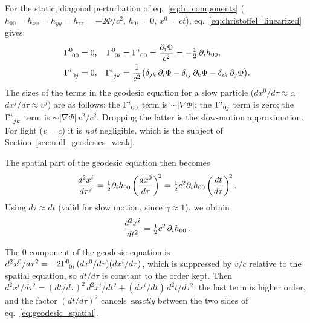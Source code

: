 \begin{derivation}
For the static, diagonal perturbation of eq.~\eqref{eq:h_components}
($h_{00} = h_{xx} = h_{yy} = h_{zz} = -2\Phi/c^2$, $h_{0i} = 0$, $x^0 = ct$),
eq.~\eqref{eq:christoffel_linearized} gives:
\begin{align*}
\Gamma^{0}_{\ 0 0} &= 0 , &
\Gamma^{0}_{\ 0 i} &= \Gamma^{i}_{\ 0 0} = \frac{\partial_i\Phi}{c^2}
  = -\tfrac12\,\partial_i h_{00} , \\
\Gamma^{i}_{\ 0 j} &= 0 , &
\Gamma^{i}_{\ j k} &= \frac{1}{c^2}\bigl(\delta_{jk}\,\partial_i\Phi
  - \delta_{ij}\,\partial_k\Phi - \delta_{ik}\,\partial_j\Phi\bigr) .
\end{align*}
The sizes of the terms in the geodesic equation for a slow particle ($dx^0/d\tau \approx c$,
$dx^j/d\tau \approx v^j$) are as follows: the $\Gamma^{i}_{\ 0 0}$ term is
$\sim|\nabla\Phi|$; the $\Gamma^{i}_{\ 0 j}$ term is zero; the
$\Gamma^{i}_{\ j k}$ term is $\sim|\nabla\Phi|\,v^2/c^2$.  Dropping the
latter is the slow-motion approximation.  For light ($v = c$) it is
\emph{not} negligible, which is the subject of
Section~\ref{sec:null_geodesics_weak}.
\end{derivation}


The spatial part of the geodesic equation then becomes
\begin{equation}
    \frac{d^2 x^i}{d\tau^2}
    = \tfrac{1}{2} \partial_i h_{00}\left(\frac{dx^0}{d\tau}\right)^{\!2}
    = \tfrac{1}{2} c^2 \partial_i h_{00}\left(\frac{dt}{d\tau}\right)^{\!2} .
    \label{eq:geodesic_spatial}
\end{equation}
Using $d\tau \approx dt$ (valid for slow motion, since $\gamma \approx 1$),
we obtain
\begin{equation}
    \frac{d^2 x^i}{dt^2} = \tfrac{1}{2} c^2\, \partial_i h_{00} \,.
    \label{eq:newton_from_geodesic}
\end{equation}

\begin{annotation}
The $0$-component of the geodesic equation is
$d^2x^0/d\tau^2 = -2\Gamma^{0}_{\ 0 i}\,(dx^0/d\tau)(dx^i/d\tau)$, which is
suppressed by $v/c$ relative to the spatial equation, so $dt/d\tau$ is
constant to the order kept.  Then
$d^2x^i/d\tau^2 = (dt/d\tau)^2\,d^2x^i/dt^2 + (dx^i/dt)\,d^2t/d\tau^2$, the
last term is higher order, and the factor $(dt/d\tau)^2$ cancels
\emph{exactly} between the two sides of eq.~\eqref{eq:geodesic_spatial}.
\end{annotation}



